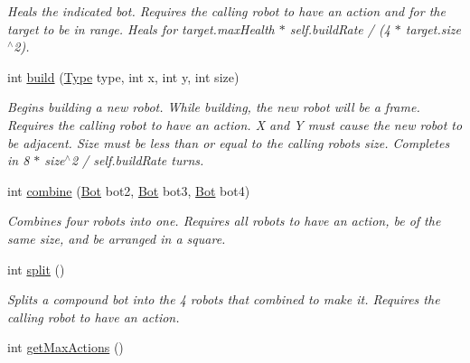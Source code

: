 \begin{DoxyCompactItemize}
\begin{DoxyCompactList}\small\item\em Heals the indicated bot. Requires the calling robot to have an action and for the target to be in range. Heals for target.maxHealth $\ast$ self.buildRate / (4 $\ast$ target.size$^\wedge$2). \item\end{DoxyCompactList}\item 
\hypertarget{classBot_ae4cd747dd0838ba6185ff826d47ea80e}{
int \hyperlink{classBot_ae4cd747dd0838ba6185ff826d47ea80e}{build} (\hyperlink{classType}{Type} type, int x, int y, int size)}
\label{classBot_ae4cd747dd0838ba6185ff826d47ea80e}

\begin{DoxyCompactList}\small\item\em Begins building a new robot. While building, the new robot will be a frame. Requires the calling robot to have an action. X and Y must cause the new robot to be adjacent. Size must be less than or equal to the calling robots size. Completes in 8 $\ast$ size$^\wedge$2 / self.buildRate turns. \item\end{DoxyCompactList}\item 
\hypertarget{classBot_a8cf1c8d53d8825c03c296fb33273627c}{
int \hyperlink{classBot_a8cf1c8d53d8825c03c296fb33273627c}{combine} (\hyperlink{classBot}{Bot} bot2, \hyperlink{classBot}{Bot} bot3, \hyperlink{classBot}{Bot} bot4)}
\label{classBot_a8cf1c8d53d8825c03c296fb33273627c}

\begin{DoxyCompactList}\small\item\em Combines four robots into one. Requires all robots to have an action, be of the same size, and be arranged in a square. \item\end{DoxyCompactList}\item 
\hypertarget{classBot_ad710db985160136aa8e3c624b26afc4e}{
int \hyperlink{classBot_ad710db985160136aa8e3c624b26afc4e}{split} ()}
\label{classBot_ad710db985160136aa8e3c624b26afc4e}

\begin{DoxyCompactList}\small\item\em Splits a compound bot into the 4 robots that combined to make it. Requires the calling robot to have an action. \item\end{DoxyCompactList}\item 
\hypertarget{classBot_a401b1a46fc56304e2f6c02c4e4eb4f8d}{
int \hyperlink{classBot_a401b1a46fc56304e2f6c02c4e4eb4f8d}{getMaxActions} ()}
\label{classBot_a401b1a46fc56304e2f6c02c4e4eb4f8d}


\end{DoxyCompactItemize}
